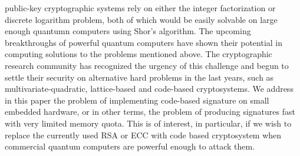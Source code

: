 \documentclass[10pt,journal,compsoc]{IEEEtran}
\begin{document}
%
%
%
%
 public-key cryptographic systems rely on either the integer factorization
or discrete logarithm problem, both of which would be easily solvable on large enough quantumn computers
using Shor's algorithm\cite{shor1997polynomial}. The upcoming breakthroughs of powerful quantum computers  have shown their potential in computing solutions to the problems mentioned above\cite{vandersypen2001experimental,xu2011quantum}. The cryptographic research community has  recognized the urgency of this challenge and begun to settle their security on alternative hard problems in the last years, such as multivariate-quadratic, lattice-based and code-based  cryptosystems\cite{bernstein2009introduction}. We address in this paper the problem of implementing code-based signature on small embedded hardware, or in other terms, the problem of producing signatures fast with very limited memory quota. This is of interest, in particular, if we wish to replace the currently used RSA or ECC with code based cryptosystem when commercial quantum computers are powerful enough to attack them.
\end{document}

